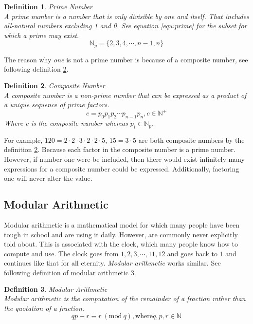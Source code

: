 \documentclass[12pt, oneside, onecolumn]{article}
\newtheorem{definition}{Definition}[section]
\newcommand{\Mod}[1]{\ (\mathrm{mod}\ #1)}
\begin{document}
\begin{definition}{Prime Number}\label{def:prime}
\\
A \emph{prime number} is a number that is only divisible by one and itself. That includes all-natural numbers excluding 1 and 0. See equation \ref{equ:prime} for the subset for which a prime may exist.
\begin{equation}
\mathbb{N}_{p} = \{2,3,4,\cdots,n-1,n\}
\end{equation}\label{equ:prime}
\end{definition}

The reason why \emph{one} is not a prime number is because of a composite number, see following definition \ref{def:comp}.

\begin{definition}{Composite Number}\label{def:comp}
\\
A composite number is a non-prime number that can be expressed as a product of a unique sequence of prime factors.
\begin{equation}
c = p_0 p_1 p_2 \cdots p_{n-1} p_{n}, c \in \mathbb{N}^{+}
\end{equation}
Where c is the composite number whereas $p_{i} \in \mathbb{N}_{p}$.
\end{definition}

For example, $120 = 2 \cdot 2 \cdot 3 \cdot 2 \cdot 2 \cdot 5$, $15 = 3 \cdot 5$ are both composite numbers by the definition \ref{def:comp}. Because each factor in the composite number is a prime number. However, if number one were be included, then there would exist infinitely many expressions for a composite number could be expressed. Additionally, factoring one will never alter the value.

%
\subsection{Modular Arithmetic}\label{sec:mod}
Modular arithmetic is a mathematical model for which many people have been tough in school and are using it daily. However, are commonly never explicitly told about. This is associated with the clock, which many people know how to compute and use. The clock goes from $1,2,3,\cdots,11,12$ and goes back to $1$ and continues like that for all eternity. \textit{Modular arithmetic} works similar. See following definition of modular arithmetic \ref{def:modular}.

\begin{definition}{Modular Arithmetic}\label{def:modular}
\\
Modular arithmetic is the computation of the remainder of a fraction rather than the quotation of a fraction.
\begin{equation}
qp +r \equiv r \Mod{q}, \text{where} q, p, r \in \mathbb{N}
\end{equation}
\end{definition}
\end{document}

